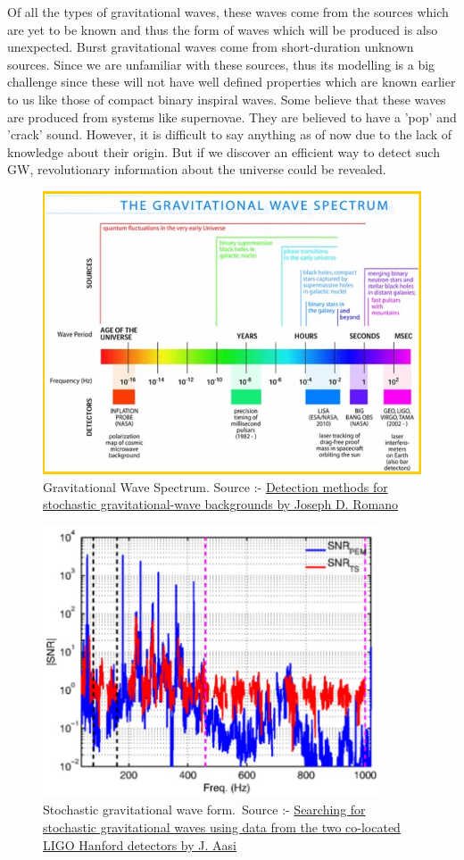\begin{enumerate}
Of all the types of gravitational waves, these waves come from the sources which are yet to be known and thus the form of waves which will be produced is also unexpected. Burst gravitational waves come from short-duration unknown sources. Since we are unfamiliar with these sources, thus its modelling is a big challenge since these will not have well defined properties which are known earlier to us like those of compact binary inspiral waves. Some believe that these waves are produced from systems like supernovae. They are believed to have a 'pop' and 'crack' sound. However, it is difficult to say anything as of now due to the lack of knowledge about their origin. But if we discover an efficient way to detect such GW, revolutionary information about the universe could be revealed.

\end{enumerate}

\begin{figure}[h]
    \centering
    \includegraphics[scale=0.6]{images.tex/Stochastic_gw.jpg}
    \caption{Gravitational Wave Spectrum. Source :- \href{https://link.springer.com/article/10.1007/s41114-017-0004-1}{Detection methods for stochastic gravitational-wave backgrounds by Joseph D. Romano}}
\end{figure}

\begin{figure}[h]
    \centering
    \includegraphics[height = 3.5 cm, width = 10cm]{images.tex/Stochastic wave form.jpg}
    \caption{Stochastic gravitational wave form.\, Source :- \href{https://journals.aps.org/prd/abstract/10.1103/PhysRevD.91.022003}{Searching for stochastic gravitational waves using data from the two co-located LIGO Hanford detectors by J. Aasi}}
\end{figure}

